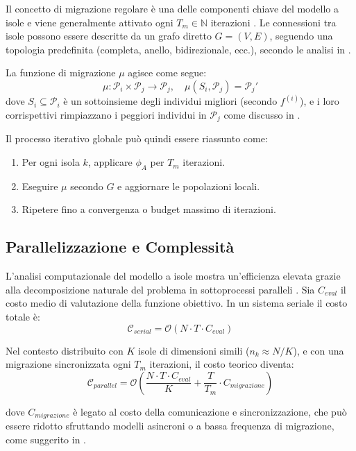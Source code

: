 \documentclass{article}
\begin{document}
Il concetto di migrazione regolare è una delle componenti chiave del modello a isole e viene generalmente attivato ogni $T_m \in \mathbb{N}$ iterazioni \cite{tomassini2005spatially}. Le connessioni tra isole possono essere descritte da un grafo diretto $G = (V, E)$, seguendo una topologia predefinita (completa, anello, bidirezionale, ecc.), secondo le analisi in \cite{cantupaz1998survey}.

La funzione di migrazione $\mu$ agisce come segue:
\[
\mu: \mathcal{P}_i \times \mathcal{P}_j \rightarrow \mathcal{P}_j, \quad \mu(S_i, \mathcal{P}_j) = \mathcal{P}_j'
\]
dove $S_i \subseteq \mathcal{P}_i$ è un sottoinsieme degli individui migliori (secondo $f^{(i)}$), e i loro corrispettivi rimpiazzano i peggiori individui in $\mathcal{P}_j$ come discusso in \cite{alba2002parallelism}.

Il processo iterativo globale può quindi essere riassunto come:

\begin{enumerate}
    \item Per ogni isola $k$, applicare $\phi_A$ per $T_m$ iterazioni.
    \item Eseguire $\mu$ secondo $G$ e aggiornare le popolazioni locali.
    \item Ripetere fino a convergenza o budget massimo di iterazioni.
\end{enumerate}

\subsection{Parallelizzazione e Complessità}

L'analisi computazionale del modello a isole mostra un'efficienza elevata grazie alla decomposizione naturale del problema in sottoprocessi paralleli \cite{alba2005parallel}. Sia $C_{eval}$ il costo medio di valutazione della funzione obiettivo. In un sistema seriale il costo totale è:
\[
\mathcal{C}_{serial} = \mathcal{O}(N \cdot T \cdot C_{eval})
\]

Nel contesto distribuito con $K$ isole di dimensioni simili ($n_k \approx N/K$), e con una migrazione sincronizzata ogni $T_m$ iterazioni, il costo teorico diventa:
\[
\mathcal{C}_{parallel} = \mathcal{O}\left(\frac{N \cdot T \cdot C_{eval}}{K} + \frac{T}{T_m} \cdot C_{migrazione}\right)
\]

dove $C_{migrazione}$ è legato al costo della comunicazione e sincronizzazione, che può essere ridotto sfruttando modelli asincroni o a bassa frequenza di migrazione, come suggerito in \cite{cantupaz1998survey}.
\end{document}
